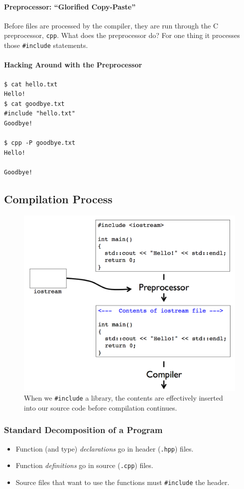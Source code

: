 \documentclass[12pt,letterpaper,twoside]{article}
\begin{document}
\paragraph{Preprocessor: ``Glorified Copy-Paste''}
Before files are processed by the compiler, they are run through the C
preprocessor, \texttt{cpp}.
What does the preprocessor do?
For one thing it processes those \texttt{\#include} statements.

\paragraph{Hacking Around with the Preprocessor}
\begin{verbatim}
$ cat hello.txt 
Hello!
$ cat goodbye.txt 
#include "hello.txt"
Goodbye!

$ cpp -P goodbye.txt 
Hello!

Goodbye!
\end{verbatim}

\subsection{Compilation Process}
\begin{figure}[h]
\centering
\includegraphics[scale=0.5]{fig/compilation.png}
\caption{\footnotesize When we \texttt{\#include} a library, the contents are effectively inserted
into our source code before compilation continues.}
\end{figure}

\subsubsection{Standard Decomposition of a Program}
\begin{itemize}
\item
  Function (and type) \emph{declarations} go in header (\texttt{.hpp})
  files.
\item
  Function \emph{definitions} go in source (\texttt{.cpp}) files.
\item
  Source files that want to use the functions must \texttt{\#include}
  the header.
\end{itemize}
\end{document}

